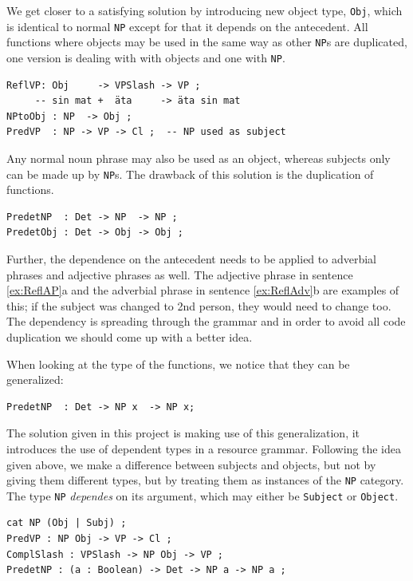 \documentclass{report}
\begin{document}
We get closer to a satisfying solution by introducing new object type,
\verb_Obj_, which is
identical to normal \verb_NP_ except for that it depends on 
the antecedent. All functions where objects may be used in the same way
as other \verb-NP-s are duplicated, one version is dealing with
with objects and one with \verb-NP-.
\begin{verbatim}
ReflVP: Obj     -> VPSlash -> VP ;
     -- sin mat +  äta     -> äta sin mat 
NPtoObj : NP  -> Obj ;
PredVP  : NP -> VP -> Cl ;  -- NP used as subject
\end{verbatim}
Any normal noun phrase may also be used as an object, whereas subjects only
can be made up by \verb-NP-s.
The drawback of this solution is the duplication of functions.
\begin{verbatim}
PredetNP  : Det -> NP  -> NP ;
PredetObj : Det -> Obj -> Obj ;
\end{verbatim}
Further, the dependence on the antecedent needs to be applied to adverbial phrases and
adjective phrases as well. The adjective phrase in sentence \ref{ex:ReflAP}a and
the adverbial phrase in sentence \ref{ex:ReflAdv}b are examples of this; if the
subject was changed to 2nd person, they  would need to change too.
 \label{ex:ReflAP2}
\vspace{-2mm}
 \label{ex:ReflAdv2}
The dependency is spreading through the grammar and in order to avoid all code
duplication we should come up with a better idea.

When looking at the type of
the functions, we notice that they can be generalized:
\begin{verbatim}
PredetNP  : Det -> NP x  -> NP x;
\end{verbatim}
The solution given in this project is making use of this generalization, it
introduces the use of dependent types in a resource grammar.
Following the idea given above, we make a difference between subjects and objects, but not
by giving them different types, but by treating them as instances of the \verb-NP- category.
The type \verb-NP- \textit{dependes} on its argument, which may either be \verb-Subject- or
\verb-Object-.
\begin{verbatim}
cat NP (Obj | Subj) ;
PredVP : NP Obj -> VP -> Cl ;
ComplSlash : VPSlash -> NP Obj -> VP ;
PredetNP : (a : Boolean) -> Det -> NP a -> NP a ;
\end{verbatim}
\end{document}
